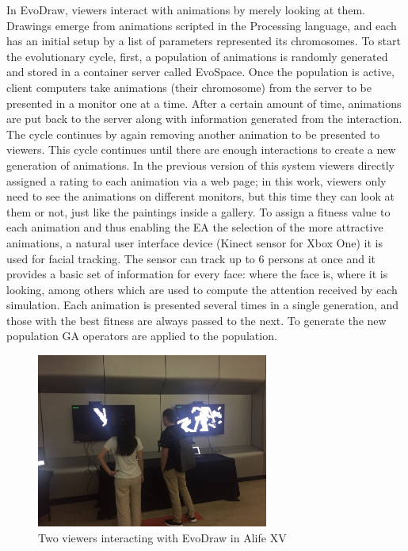 \documentclass[letterpaper]{article}
\begin{document}
In EvoDraw, viewers interact with animations by merely looking at them. Drawings
emerge from animations scripted in the Processing language, and each has an
initial setup by a list of parameters represented its chromosomes. To start the
evolutionary cycle, first, a population of animations is randomly generated and
stored in a container server called EvoSpace. Once the population is active,
client computers take animations  (their chromosome) from the server to be
presented in a monitor one at a time. After a certain amount of time, animations
are put back to the server along with information generated from the
interaction. The cycle continues by again removing another animation to be
presented to viewers. This cycle continues until there are enough interactions
to create a new generation of animations. In the previous version of this system
\citep{garcia2013evospace} viewers directly assigned a rating to each animation
via a web page; in this work, viewers only need to see the animations on
different monitors, but this time they can look at them or not, just like the
paintings inside a gallery. To assign a fitness value to each animation and thus
enabling the EA the selection of the more attractive animations, a natural user
interface device (Kinect sensor for Xbox One) it is used for facial tracking.
The sensor can track up to 6 persons at once and it provides a basic set of
information for every face: where the face is, where it is looking, among others
which are used to compute the attention received by each simulation. Each
animation is presented several times in a single generation, and those with the
best fitness are always passed to the next. To generate the new population GA
operators are applied to the population.  

\begin{figure}[!t]
\centering
\includegraphics[width=3in]{two.jpg}
\caption{Two viewers interacting with EvoDraw in Alife XV}
\label{fig:two}
\end{figure}
\end{document}
